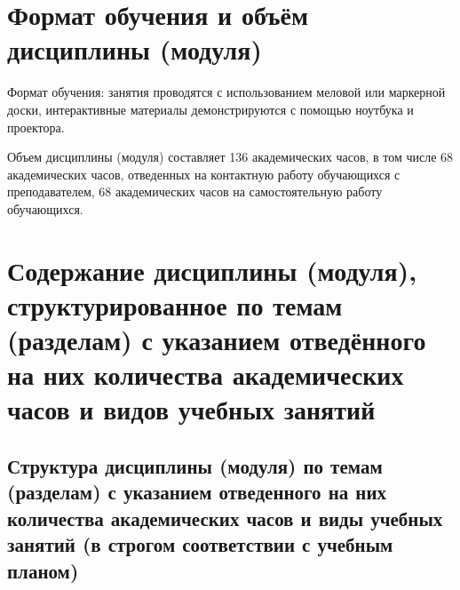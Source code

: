 \documentclass[a4paper, 12pt]{article}
\begin{document}
\section{Формат обучения и объём дисциплины (модуля)}

Формат обучения: занятия проводятся с использованием меловой или маркерной доски, интерактивные материалы демонстрируются с помощью ноутбука и проектора.

Объем дисциплины (модуля) составляет 136 академических часов, в том числе 68 академических часов, отведенных на контактную работу обучающихся с преподавателем, 68 академических часов на самостоятельную работу обучающихся.


\section{Содержание дисциплины (модуля), структурированное по темам (разделам) с указанием отведённого на них количества академических часов и видов учебных занятий}

\subsection{Структура дисциплины (модуля) по темам (разделам) с указанием отведенного на них количества академических часов и виды учебных занятий (в строгом соответствии с учебным планом)}
\end{document}
